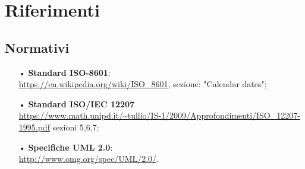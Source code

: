 \section{Riferimenti}

\subsection{Normativi}
\begin{itemize}
\item[•]\textbf{Standard {ISO}-8601}:\\
\url{https://en.wikipedia.org/wiki/ISO_8601}, sezione: "Calendar dates";
\item[•]\textbf{Standard ISO/{IEC} 12207}\\
\url{https://www.math.unipd.it/~tullio/IS-1/2009/Approfondimenti/ISO_12207-1995.pdf} sezioni 5,6,7;
\item[•]\textbf{Specifiche {UML} 2.0}:\\
\url{http://www.omg.org/spec/UML/2.0/}.

\end{itemize} 
